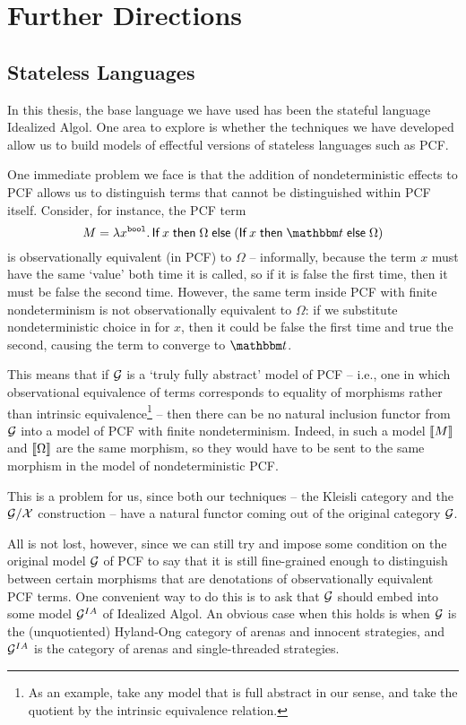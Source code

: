 \documentclass[11pt]{report}
\begin{document}
\chapter{Further Directions}

\section{Stateless Languages}
\label{SecStatelessLanguages}

In this thesis, the base language we have used has been the stateful language Idealized Algol.  
One area to explore is whether the techniques we have developed allow us to build models of effectful versions of stateless languages such as PCF.

One immediate problem we face is that the addition of nondeterministic effects to PCF allows us to distinguish terms that cannot be distinguished within PCF itself.  
Consider, for instance, the PCF term
\[
  M = \lambda x^{\bool}.\If x \Then \Omega \Else (\If x \Then \true \Else \Omega)
  \]
is observationally equivalent (in PCF) to $\Omega$ -- informally, because the term $x$ must have the same `value' both time it is called, so if it is false the first time, then it must be false the second time.
However, the same term inside PCF with finite nondeterminism is not observationally equivalent to $\Omega$: if we substitute nondeterministic choice in for $x$, then it could be false the first time and true the second, causing the term to converge to $\true$.

This means that if $\mathcal G$ is a `truly fully abstract' model of PCF -- i.e., one in which observational equivalence of terms corresponds to equality of morphisms rather than intrinsic equivalence\footnote{As an example, take any model that is full abstract in our sense, and take the quotient by the intrinsic equivalence relation.} -- then there can be no natural inclusion functor from $\mathcal G$ into a model of PCF with finite nondeterminism.  
Indeed, in such a model $\left\llbracket M\right\rrbracket$ and $\left\llbracket\Omega\right\rrbracket$ are the same morphism, so they would have to be sent to the same morphism in the model of nondeterministic PCF.

This is a problem for us, since both our techniques -- the Kleisli category and the $\mathcal G/\mathcal X$ construction -- have a natural functor coming out of the original category $\mathcal G$.

All is not lost, however, since we can still try and impose some condition on the original model $\mathcal G$ of PCF to say that it is still fine-grained enough to distinguish between certain morphisms that are denotations of observationally equivalent PCF terms.  
One convenient way to do this is to ask that $\mathcal G$ should embed into some model $\mathcal G^{IA}$ of Idealized Algol.  
An obvious case when this holds is when $\mathcal G$ is the (unquotiented) Hyland-Ong category of arenas and innocent strategies, and $\mathcal G^{IA}$ is the category of arenas and single-threaded strategies.
\end{document}
